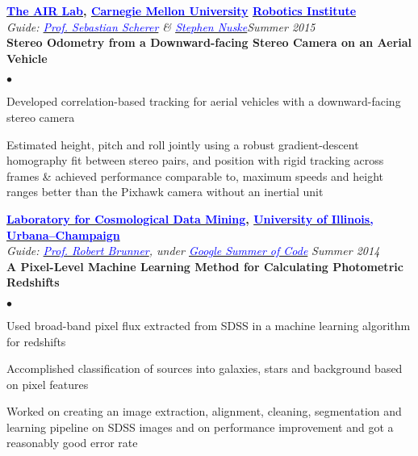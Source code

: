 \documentclass[margin,line]{res}
\newenvironment{list2}{
  \begin{list}{$\bullet$}{%
      \setlength{\itemsep}{0in}
      \setlength{\parsep}{0in} \setlength{\parskip}{0in}
      \setlength{\topsep}{0in} \setlength{\partopsep}{0in} 
      \setlength{\leftmargin}{0.18in}}}{\end{list}}
\begin{document}
\begin{resume}
{\bf  \href{http://theairlab.org/}{\textcolor{blue}{The AIR Lab}}, \href{http://www.cmu.edu/}{\textcolor{blue}{Carnegie Mellon University}} \href{http://ri.cmu.edu/}{\textcolor{blue}{Robotics Institute}}} \\
{\em Guide: \href{http://www.ri.cmu.edu/person.html?person_id=1397}{\textcolor{blue}{Prof. Sebastian Scherer}} \& \href{http://www.ri.cmu.edu/person.html?person_id=2128}{\textcolor{blue} {Stephen Nuske}}}\hfill\textit{Summer 2015} \\
\vspace*{-.13in}
\textbf{Stereo Odometry from a Downward-facing Stereo Camera on an Aerial Vehicle} \\
\vspace*{-.01in}
\begin{list2}
\item Developed correlation-based tracking for aerial vehicles with a downward-facing stereo camera
\item Estimated height, pitch and roll jointly using a robust gradient-descent homography fit between stereo pairs, and position with rigid tracking across frames \& achieved performance comparable to, maximum speeds and height ranges better than the Pixhawk camera without an inertial unit
\end{list2}

\vspace*{-0.13in}

{\bf \href{http://lcdm.astro.illinois.edu/}{\textcolor{blue} {Laboratory for Cosmological Data Mining}}, \href{http://www.illinois.edu/}{\textcolor{blue}{University of Illinois, Urbana--Champaign}}} \\
{\em Guide: \href{http://www.astro.illinois.edu/people/bigdog}{\textcolor{blue}{Prof. Robert Brunner}}, under \href{https://www.google-melange.com/gsoc/homepage/google/gsoc2014}{\textcolor{blue} {Google Summer of Code}}} \hfill {\it Summer 2014} \\
\vspace*{-.13in}
\textbf{A Pixel-Level Machine Learning Method for Calculating Photometric Redshifts} \\
\vspace*{-.01in}
\begin{list2}
\item Used broad-band pixel flux extracted from SDSS in a machine learning algorithm for redshifts
\item Accomplished classification of sources into galaxies, stars and background based on pixel features
\item Worked on creating an image extraction, alignment, cleaning, segmentation and learning pipeline on SDSS images and on performance improvement and got a reasonably good error rate
\end{list2}


\end{resume}
\end{document}

